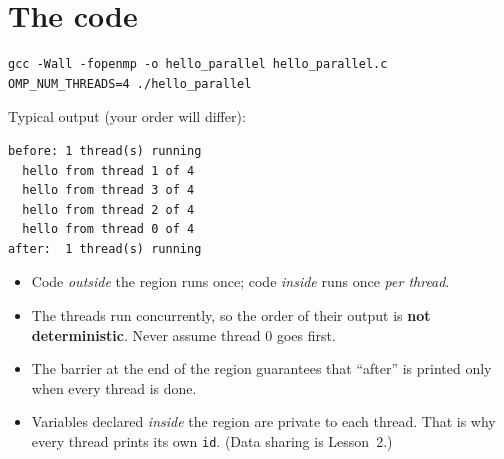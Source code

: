 \documentclass[11pt,a4paper]{article}
\begin{document}
\section{The code}


\begin{lstlisting}[style=sh]
gcc -Wall -fopenmp -o hello_parallel hello_parallel.c
OMP_NUM_THREADS=4 ./hello_parallel
\end{lstlisting}
Typical output (your order will differ):
\begin{lstlisting}[style=sh]
before: 1 thread(s) running
  hello from thread 1 of 4
  hello from thread 3 of 4
  hello from thread 2 of 4
  hello from thread 0 of 4
after:  1 thread(s) running
\end{lstlisting}

\begin{keyidea}
\begin{itemize}
  \item Code \emph{outside} the region runs once; code \emph{inside} runs once \emph{per thread}.
  \item The threads run concurrently, so the order of their output is \textbf{not
        deterministic}. Never assume thread 0 goes first.
  \item The barrier at the end of the region guarantees that ``after'' is printed only
        when every thread is done.
  \item Variables declared \emph{inside} the region are private to each thread.
        That is why every thread prints its own \texttt{id}. (Data sharing is Lesson~2.)
\end{itemize}
\end{keyidea}
\end{document}

